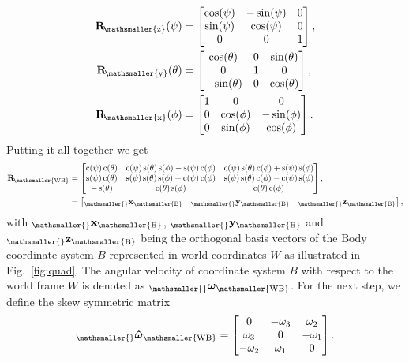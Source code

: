 \documentclass[10pt,a4paper,fleqn]{article}
\newcommand{\ssin}[0]{\operatorname{s}}
\newcommand{\scos}[0]{\operatorname{c}}
\newcommand{\bVec}[1]{\mathbf{#1}}
\newcommand{\vect}[3]{{_{\mathsmaller{\mathrm{#2}}}\mathbf{#1}_{\mathsmaller{\mathrm{#3}}}}} %
\newcommand{\wfr}[0]{\ensuremath{W}} %
\newcommand{\bfr}[0]{\ensuremath{B}} %
\newcommand{\ori}[1]{\bVec{R}_{\!\mathsmaller{\mathrm{#1}}}} %
\newcommand{\bodyrate}[0]{\omega} %
\newcommand{\bodyrates}[0]{\boldsymbol{\bodyrate}} %
\begin{document}
\begin{align}
\ori{z}(\psi) &= 
\begin{bmatrix} 
	\cos (\psi) & -\sin (\psi) & 0 \\
	\sin (\psi) & \cos (\psi) & 0 \\
	0 & 0 & 1 \\	
\end{bmatrix},
\\
\ori{y}(\theta) &= 
\begin{bmatrix} 
	\cos (\theta) & 0 & \sin (\theta) \\
	0 & 1 & 0 \\
	-\sin (\theta) & 0 & \cos (\theta)
\end{bmatrix},
\\
\ori{x}(\phi) &= 
\begin{bmatrix} 
	1 & 0 & 0 \\
	0 & \cos (\phi) & -\sin (\phi) \\
	0 & \sin (\phi) & \cos (\phi) \\
\end{bmatrix}.
\end{align}
%
Putting it all together we get
%
\begin{align}
\ori{\wfr \bfr} &= \begin{bmatrix}
\scos(\psi)\scos(\theta) & \scos(\psi)\ssin(\theta)\ssin(\phi)-\ssin(\psi)\scos(\phi) & \scos(\psi)\ssin(\theta)\scos(\phi)+\ssin(\psi)\ssin(\phi) \\
\ssin(\psi)\scos(\theta) & \ssin(\psi)\ssin(\theta)\ssin(\phi)+\scos(\psi)\scos(\phi) & \ssin(\psi)\ssin(\theta)\scos(\phi)-\scos(\psi)\ssin(\phi) \\
-\ssin(\theta) & \scos(\theta)\ssin(\phi) & \scos(\theta)\scos(\phi)
\end{bmatrix}, \\
	&= \begin{bmatrix} \vect{x}{}{\bfr} & \vect{y}{}{\bfr} & \vect{z}{}{\bfr} \end{bmatrix}, \label{eq:r_basis_vectors}
\end{align}
%
with $\vect{x}{}{\bfr}$, $\vect{y}{}{\bfr}$ and $\vect{z}{}{\bfr}$ being the orthogonal basis vectors of the Body coordinate system $\bfr$ represented in world coordinates $\wfr$ as illustrated in Fig.~\ref{fig:quad}.
The angular velocity of coordinate system $\bfr$ with respect to the world frame $\wfr$ is denoted as $\vect{\bodyrates}{}{\wfr \bfr}$. 
For the next step, we define the skew symmetric matrix
%
\begin{equation}
\vect{\hat{\bodyrates}}{}{\wfr \bfr} = 
	\begin{bmatrix} 
    	0 & -\omega_{3} & \omega_{2}\\
    	\omega_{3}& 0 &-\omega_{1}\\
    	-\omega_{2} & \omega_{1} & 0 
    \end{bmatrix} .
\end{equation}
\end{document}
